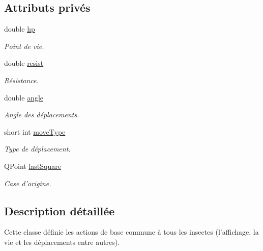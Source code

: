 \subsection*{Attributs privés}
\begin{DoxyCompactItemize}
\item 
double \hyperlink{classBug_a3ebb13469010dbcd7bd7875455e022c3}{hp}
\begin{DoxyCompactList}\small\item\em Point de vie. \end{DoxyCompactList}\item 
double \hyperlink{classBug_a98590009992312ec6508e334bd02e529}{resist}
\begin{DoxyCompactList}\small\item\em Résistance. \end{DoxyCompactList}\item 
double \hyperlink{classBug_a096a8babe1be6df06b5dea87dc3eb1fe}{angle}
\begin{DoxyCompactList}\small\item\em Angle des déplacements. \end{DoxyCompactList}\item 
short int \hyperlink{classBug_a00484a34d1e537e92b0bba7e2e5ddbeb}{moveType}
\begin{DoxyCompactList}\small\item\em Type de déplacement. \end{DoxyCompactList}\item 
QPoint \hyperlink{classBug_aead6b14a5cfd6713e8913f3e84cd6797}{lastSquare}
\begin{DoxyCompactList}\small\item\em Case d'origine. \end{DoxyCompactList}\end{DoxyCompactItemize}


\subsection{Description détaillée}
Cette classe définie les actions de base commune à tous les insectes (l'affichage, la vie et les déplacements entre autres). 

